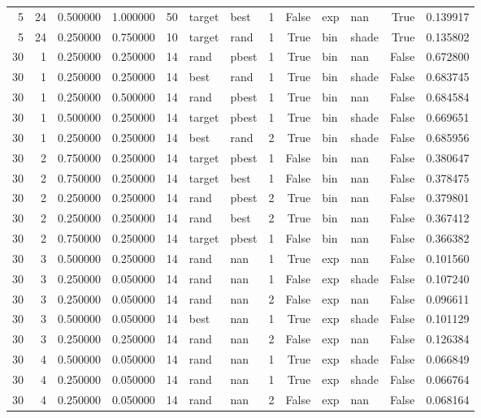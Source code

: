\begin{tabular}{rrrrrllrrllrr}
5 & 24 & 0.500000 & 1.000000 & 50 & target & best & 1 & False & exp & nan & True & 0.139917 \\
5 & 24 & 0.250000 & 0.750000 & 10 & target & rand & 1 & True & bin & shade & True & 0.135802 \\
30 & 1 & 0.250000 & 0.250000 & 14 & rand & pbest & 1 & True & bin & nan & False & 0.672800 \\
30 & 1 & 0.250000 & 0.250000 & 14 & best & rand & 1 & True & bin & shade & False & 0.683745 \\
30 & 1 & 0.250000 & 0.500000 & 14 & rand & pbest & 1 & True & bin & nan & False & 0.684584 \\
30 & 1 & 0.500000 & 0.250000 & 14 & target & pbest & 1 & True & bin & shade & False & 0.669651 \\
30 & 1 & 0.250000 & 0.250000 & 14 & best & rand & 2 & True & bin & shade & False & 0.685956 \\
30 & 2 & 0.750000 & 0.250000 & 14 & target & pbest & 1 & False & bin & nan & False & 0.380647 \\
30 & 2 & 0.750000 & 0.250000 & 14 & target & best & 1 & False & bin & nan & False & 0.378475 \\
30 & 2 & 0.250000 & 0.250000 & 14 & rand & pbest & 2 & True & bin & nan & False & 0.379801 \\
30 & 2 & 0.250000 & 0.250000 & 14 & rand & best & 2 & True & bin & nan & False & 0.367412 \\
30 & 2 & 0.750000 & 0.250000 & 14 & target & pbest & 1 & False & bin & nan & False & 0.366382 \\
30 & 3 & 0.500000 & 0.250000 & 14 & rand & nan & 1 & True & exp & nan & False & 0.101560 \\
30 & 3 & 0.250000 & 0.050000 & 14 & rand & nan & 1 & False & exp & shade & False & 0.107240 \\
30 & 3 & 0.250000 & 0.050000 & 14 & rand & nan & 2 & False & exp & nan & False & 0.096611 \\
30 & 3 & 0.500000 & 0.050000 & 14 & best & nan & 1 & True & exp & shade & False & 0.101129 \\
30 & 3 & 0.250000 & 0.250000 & 14 & rand & nan & 2 & False & exp & nan & False & 0.126384 \\
30 & 4 & 0.500000 & 0.050000 & 14 & rand & nan & 1 & True & exp & shade & False & 0.066849 \\
30 & 4 & 0.250000 & 0.050000 & 14 & rand & nan & 1 & True & exp & shade & False & 0.066764 \\
30 & 4 & 0.250000 & 0.050000 & 14 & rand & nan & 2 & False & exp & nan & False & 0.068164 \\

\end{tabular}
